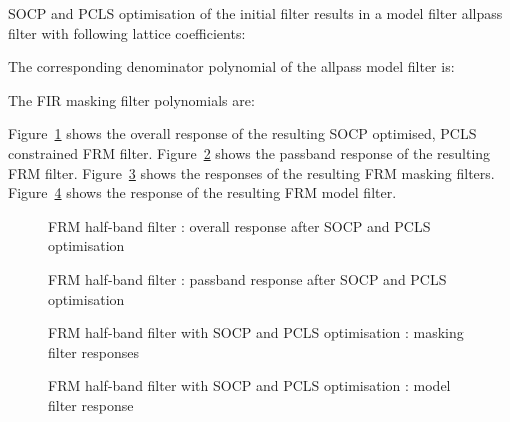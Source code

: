 \documentclass[a4paper,twoside,10pt,english]{report}
\begin{document}
SOCP and PCLS optimisation of the initial filter results in a 
model filter allpass filter with following lattice coefficients:
\begin{small}


\end{small}
The corresponding denominator polynomial of the allpass model filter is:
\begin{small}

\end{small}
The FIR masking filter polynomials are:
\begin{small}


\end{small}
Figure~\ref{fig:schurOneMAPlattice-frm-half-band-socp-pcls-response} 
shows the overall response of the resulting SOCP optimised, PCLS constrained
FRM filter. 
Figure~\ref{fig:schurOneMAPlattice-frm-half-band-socp-pcls-passband-response} 
shows the passband response of the resulting FRM filter. 
Figure~\ref{fig:schurOneMAPlattice-frm-half-band-socp-pcls-mask-response} 
shows the responses of the resulting FRM masking filters. 
Figure~\ref{fig:schurOneMAPlattice-frm-half-band-socp-pcls-model-response} 
shows the response of the resulting FRM model filter.
\begin{figure}[!htbp]
\begin{center}
\scalebox{0.7}{}
\caption{FRM half-band filter : overall response after SOCP and PCLS optimisation }
\label{fig:schurOneMAPlattice-frm-half-band-socp-pcls-response}
\end{center}
\end{figure}
\begin{figure}[!htbp]
\begin{center}
\scalebox{0.7}{}
\caption{FRM half-band filter : passband response after SOCP and PCLS optimisation}
\label{fig:schurOneMAPlattice-frm-half-band-socp-pcls-passband-response}
\end{center}
\end{figure}
\begin{figure}[!htbp]
\begin{center}
\scalebox{0.7}{}
\caption{FRM half-band filter with SOCP and PCLS optimisation : masking filter responses}
\label{fig:schurOneMAPlattice-frm-half-band-socp-pcls-mask-response}
\end{center}
\end{figure}
\begin{figure}[!htbp]
\begin{center}
\scalebox{0.7}{}
\caption{FRM half-band filter with SOCP and PCLS optimisation : model filter response}
\label{fig:schurOneMAPlattice-frm-half-band-socp-pcls-model-response}
\end{center}
\end{figure}
\clearpage
\end{document}
